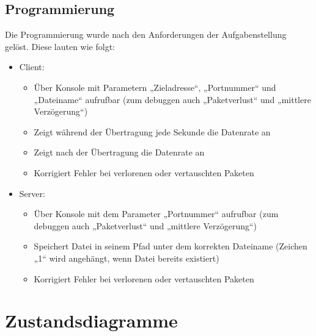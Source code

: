 \subsection{Programmierung}

Die Programmierung wurde nach den Anforderungen der Aufgabenstellung gelöst. Diese lauten wie folgt:
\begin{itemize}
\item Client:
\begin{itemize}
\item Über Konsole mit Parametern „Zieladresse“, „Portnummer“ und „Dateiname“ aufrufbar (zum debuggen auch „Paketverlust“ und „mittlere Verzögerung“)
\item Zeigt während der Übertragung jede Sekunde die Datenrate an
\item Zeigt nach der Übertragung die Datenrate an
\item Korrigiert Fehler bei verlorenen oder vertauschten Paketen
\end{itemize}
\item Server:
\begin{itemize}
\item Über Konsole mit dem Parameter „Portnummer“ aufrufbar (zum debuggen auch „Paketverlust“ und „mittlere Verzögerung“)
\item Speichert Datei in seinem Pfad unter dem korrekten Dateiname (Zeichen „1“ wird angehängt, wenn Datei bereits existiert)
\item Korrigiert Fehler bei verlorenen oder vertauschten Paketen
\end{itemize}
\end{itemize}

\section{Zustandsdiagramme}
\label{stated}
